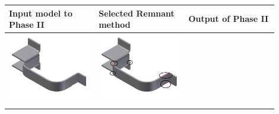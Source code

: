 \begin{minipage}[t]{0.9\linewidth}
\begin{tabular}[h]{@{} p{0.3\linewidth}| p{0.3\linewidth}|  p{0.3\linewidth}@{}} \toprule

\textbf{Input model to Phase II} & \textbf{Selected Remnant method} & \textbf{Output of Phase II} \\ \midrule


\includegraphics[width=0.98\linewidth]{..//Common/images/DefeatBracketPhase_I_3} &
\includegraphics[width=0.98\linewidth]{..//Common/images/DefeatBracketPhase_II_2_circled} &

\end{tabular}
\end{minipage}
